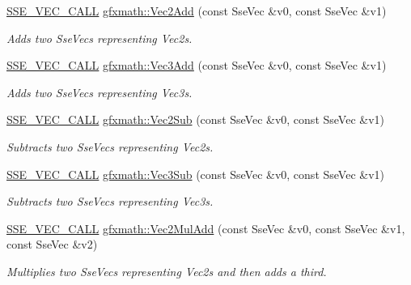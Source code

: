 \begin{DoxyCompactItemize}
\hyperlink{ssevec__math__defs_8h_a97454f977a5281455cecacce1e8ba670}{S\+S\+E\+\_\+\+V\+E\+C\+\_\+\+C\+A\+L\+L} \hyperlink{group___s_i_m_d_vec_math_ga29878372e95cf910318ded73fc8ddf32}{gfxmath\+::\+Vec2\+Add} (const Sse\+Vec \&v0, const Sse\+Vec \&v1)
\begin{DoxyCompactList}\small\item\em Adds two Sse\+Vecs representing Vec2s. \end{DoxyCompactList}\item 
\hyperlink{ssevec__math__defs_8h_a97454f977a5281455cecacce1e8ba670}{S\+S\+E\+\_\+\+V\+E\+C\+\_\+\+C\+A\+L\+L} \hyperlink{group___s_i_m_d_vec_math_ga5517ceabe08dbd131b66cfe2f9a69209}{gfxmath\+::\+Vec3\+Add} (const Sse\+Vec \&v0, const Sse\+Vec \&v1)
\begin{DoxyCompactList}\small\item\em Adds two Sse\+Vecs representing Vec3s. \end{DoxyCompactList}\item 
\hyperlink{ssevec__math__defs_8h_a97454f977a5281455cecacce1e8ba670}{S\+S\+E\+\_\+\+V\+E\+C\+\_\+\+C\+A\+L\+L} \hyperlink{group___s_i_m_d_vec_math_ga8478f24ca65fd962fc3d40e2cf717674}{gfxmath\+::\+Vec2\+Sub} (const Sse\+Vec \&v0, const Sse\+Vec \&v1)
\begin{DoxyCompactList}\small\item\em Subtracts two Sse\+Vecs representing Vec2s. \end{DoxyCompactList}\item 
\hyperlink{ssevec__math__defs_8h_a97454f977a5281455cecacce1e8ba670}{S\+S\+E\+\_\+\+V\+E\+C\+\_\+\+C\+A\+L\+L} \hyperlink{group___s_i_m_d_vec_math_ga5f3b7d87abe3715706c16b516b70b576}{gfxmath\+::\+Vec3\+Sub} (const Sse\+Vec \&v0, const Sse\+Vec \&v1)
\begin{DoxyCompactList}\small\item\em Subtracts two Sse\+Vecs representing Vec3s. \end{DoxyCompactList}\item 
\hyperlink{ssevec__math__defs_8h_a97454f977a5281455cecacce1e8ba670}{S\+S\+E\+\_\+\+V\+E\+C\+\_\+\+C\+A\+L\+L} \hyperlink{group___s_i_m_d_vec_math_gad909161c79a7eb47e0412e98d5dbc02f}{gfxmath\+::\+Vec2\+Mul\+Add} (const Sse\+Vec \&v0, const Sse\+Vec \&v1, const Sse\+Vec \&v2)
\begin{DoxyCompactList}\small\item\em Multiplies two Sse\+Vecs representing Vec2s and then adds a third. \end{DoxyCompactList}\item 

\end{DoxyCompactItemize}
